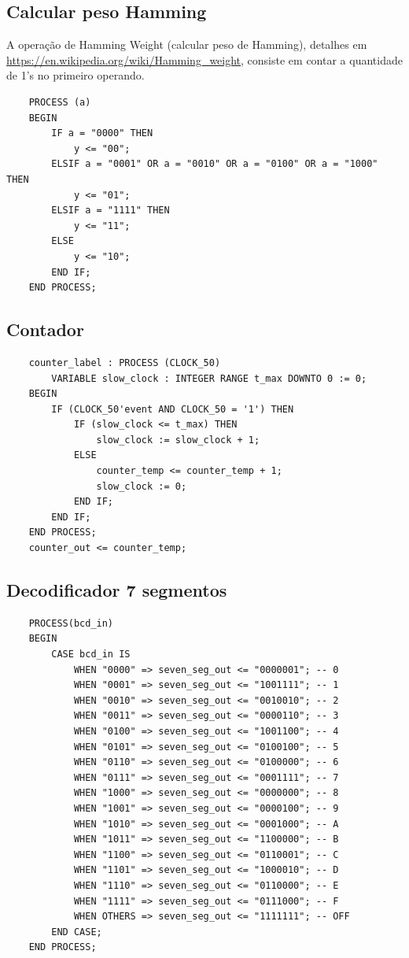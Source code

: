 \documentclass[12pt]{article}
\begin{document}
\subsection*{Calcular peso Hamming}

A operação de Hamming Weight (calcular peso de Hamming), detalhes em \url{https://en.wikipedia.org/wiki/Hamming_weight}, consiste em contar a quantidade de 1's no primeiro operando.

\begin{verbatim}
    PROCESS (a)
    BEGIN
        IF a = "0000" THEN
            y <= "00";
        ELSIF a = "0001" OR a = "0010" OR a = "0100" OR a = "1000" THEN
            y <= "01";
        ELSIF a = "1111" THEN
            y <= "11";
        ELSE
            y <= "10";
        END IF;
    END PROCESS;
\end{verbatim}

\subsection*{Contador}

\begin{verbatim}
    counter_label : PROCESS (CLOCK_50)
        VARIABLE slow_clock : INTEGER RANGE t_max DOWNTO 0 := 0;
    BEGIN
        IF (CLOCK_50'event AND CLOCK_50 = '1') THEN
            IF (slow_clock <= t_max) THEN
                slow_clock := slow_clock + 1;
            ELSE
                counter_temp <= counter_temp + 1;
                slow_clock := 0;
            END IF;
        END IF;
    END PROCESS;
    counter_out <= counter_temp;
\end{verbatim}

\subsection*{Decodificador 7 segmentos}

\begin{verbatim}
    PROCESS(bcd_in)
    BEGIN
        CASE bcd_in IS
            WHEN "0000" => seven_seg_out <= "0000001"; -- 0
            WHEN "0001" => seven_seg_out <= "1001111"; -- 1
            WHEN "0010" => seven_seg_out <= "0010010"; -- 2
            WHEN "0011" => seven_seg_out <= "0000110"; -- 3
            WHEN "0100" => seven_seg_out <= "1001100"; -- 4
            WHEN "0101" => seven_seg_out <= "0100100"; -- 5
            WHEN "0110" => seven_seg_out <= "0100000"; -- 6
            WHEN "0111" => seven_seg_out <= "0001111"; -- 7
            WHEN "1000" => seven_seg_out <= "0000000"; -- 8
            WHEN "1001" => seven_seg_out <= "0000100"; -- 9
            WHEN "1010" => seven_seg_out <= "0001000"; -- A
            WHEN "1011" => seven_seg_out <= "1100000"; -- B
            WHEN "1100" => seven_seg_out <= "0110001"; -- C
            WHEN "1101" => seven_seg_out <= "1000010"; -- D
            WHEN "1110" => seven_seg_out <= "0110000"; -- E
            WHEN "1111" => seven_seg_out <= "0111000"; -- F
            WHEN OTHERS => seven_seg_out <= "1111111"; -- OFF
        END CASE;
    END PROCESS;
\end{verbatim}
\end{document}
